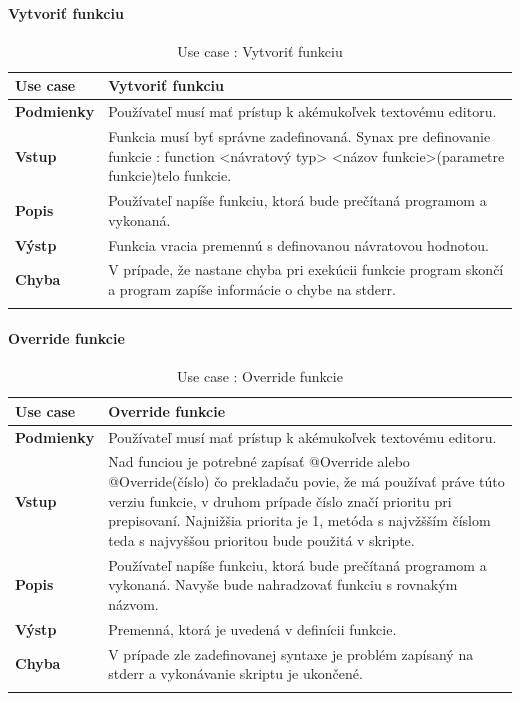 \paragraph{Vytvoriť funkciu}
\begin{center}
	\begin{longtable}{|p{2.5cm}|p{14cm}|}
		
			\hline
			\textbf{Use case} & Vytvoriť funkciu \\ 
			\hline
			\textbf{Podmienky} & Používateľ musí mať prístup k akémukoľvek textovému editoru.  \\ 
			\hline
			\textbf{Vstup} & Funkcia musí byť správne zadefinovaná. 
			Synax pre definovanie funkcie : 
			function <návratový typ> <názov funkcie>(parametre funkcie){telo funkcie}. \\
			\hline
			
			\textbf{Popis} & Používateľ napíše funkciu, ktorá bude prečítaná programom a vykonaná.\\ 
			\hline

			\textbf{Výstp} & Funkcia vracia premennú s definovanou návratovou hodnotou.\\
			\hline
			\textbf{Chyba} & V prípade, že nastane chyba pri exekúcii funkcie program skončí a program zapíše informácie o chybe na stderr.\\
			\hline
		\caption{Use case : Vytvoriť funkciu}
		\label{table:1}
		
	\end{longtable}
\end{center}
\paragraph{Override funkcie}
\begin{center}
	\begin{longtable}{|p{2.5cm}|p{14cm}|}
		
			\hline
			\textbf{Use case} & Override funkcie \\ 
			\hline
			\textbf{Podmienky} & Používateľ musí mať prístup k akémukoľvek textovému editoru.  \\ 
			\hline
			\textbf{Vstup} & Nad funciou je potrebné zapísať @Override alebo @Override(číslo) čo prekladaču povie, že má používať práve túto verziu funkcie, v druhom prípade číslo značí prioritu pri prepisovaní. Najnižšia priorita je 1, metóda s najvžšším číslom teda s najvyššou prioritou bude použitá v skripte.\\
			\hline
			
			\textbf{Popis} & Používateľ napíše funkciu, ktorá bude prečítaná programom a vykonaná. Navyše bude nahradzovať funkciu s rovnakým názvom.\\ 
			\hline
			\textbf{Výstp} & Premenná, ktorá je uvedená v definícii funkcie.\\
			\hline
			\textbf{Chyba} & V prípade zle zadefinovanej syntaxe je problém zapísaný na stderr a vykonávanie skriptu je ukončené.\\
			\hline
		\caption{Use case : Override funkcie}
		\label{table:1}
		
	\end{longtable}
\end{center}
